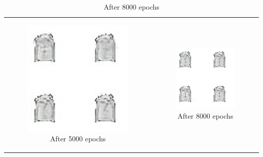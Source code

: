 \documentclass[conference]{IEEEtran}
\begin{document}
\begin{table}[ht]
\begin{tabular}{cc}
\newline
\begin{subfigure}{0.23\textwidth}\centering\includegraphics[width=1\columnwidth]{resources/gen_fmnist/ex5000_adv.png}\caption{After 5000 epochs}\label{fig:tabc}\end{subfigure}&
\begin{subfigure}{0.23\textwidth}\centering\includegraphics[width=1\columnwidth]{resources/gen_fmnist/ex8000_adv.png}\caption{After 8000 epochs}\label{fig:taba2}\end{subfigure}\\

\end{tabular}
\end{table}
\end{document}
